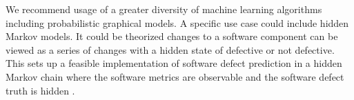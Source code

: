 \documentclass{sig-alternate-05-2015}
\begin{document}
We recommend usage of a greater diversity of machine learning algorithms including probabilistic graphical models. A specific use case could include hidden Markov models. It could be theorized changes to a software component can be viewed as a series of changes with a hidden state of defective or not defective. This sets up a feasible implementation of software defect prediction in a hidden Markov chain where the software metrics are observable and the software defect truth is hidden \cite{Bishop:2006:PRM:1162264}.


  
\end{document}

